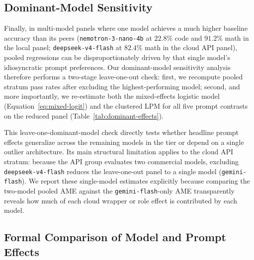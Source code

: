 \documentclass[a4paper,fleqn]{cas-sc}
\begin{document}
\subsection{Dominant-Model Sensitivity}\label{dominant-model-sensitivity}

Finally, in multi-model panels where one model achieves a much higher baseline accuracy than its peers (\texttt{nemotron-3-nano-4b} at $22.8\%$ code and $91.2\%$ math in the local panel; \texttt{deepseek-v4-flash} at $82.4\%$ math in the cloud API panel), pooled regressions can be disproportionately driven by that single model's idiosyncratic prompt preferences. Our dominant-model sensitivity analysis therefore performs a two-stage leave-one-out check: first, we recompute pooled stratum pass rates after excluding the highest-performing model; second, and more importantly, we re-estimate both the mixed-effects logistic model (Equation~\ref{eq:mixed-logit}) and the clustered LPM for all five prompt contrasts on the reduced panel (Table~\ref{tab:dominant-effects}).

This leave-one-dominant-model check directly tests whether headline prompt effects generalize across the remaining models in the tier or depend on a single outlier architecture. Its main structural limitation applies to the cloud API stratum: because the API group evaluates two commercial models, excluding \texttt{deepseek-v4-flash} reduces the leave-one-out panel to a single model (\texttt{gemini-flash}). We report these single-model estimates explicitly because comparing the two-model pooled AME against the \texttt{gemini-flash}-only AME transparently reveals how much of each cloud wrapper or role effect is contributed by each model.

\subsection{Formal Comparison of Model and Prompt Effects}\label{formal-model-prompt-comparison}
\end{document}
